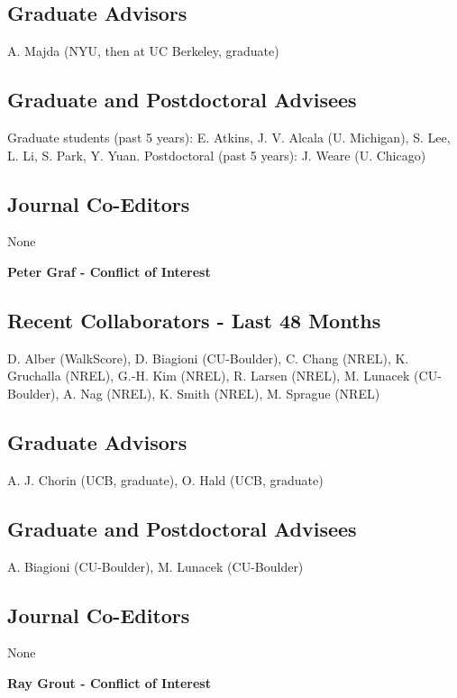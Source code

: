 \documentclass[11pt]{article}
\begin{document}
\subsection*{Graduate Advisors}
A. Majda (NYU, then at UC Berkeley, graduate)

\subsection*{Graduate and Postdoctoral Advisees} 
Graduate students (past 5 years): E. Atkins, J. V. Alcala (U. Michigan), S. Lee, L. Li, S. Park, Y. Yuan.
Postdoctoral (past 5 years): J. Weare (U. Chicago)

\subsection*{Journal Co-Editors} None


\newpage
\begin{center}
{\Large{\textbf{Peter Graf - Conflict of Interest}}}
\end{center}

\subsection*{Recent Collaborators - Last 48 Months}
D. Alber (WalkScore), D. Biagioni (CU-Boulder), C. Chang (NREL), K. Gruchalla (NREL), G.-H. Kim (NREL), R. Larsen (NREL), M. Lunacek (CU-Boulder), A. Nag (NREL), K. Smith (NREL), M. Sprague (NREL)


\subsection*{Graduate Advisors}
A. J. Chorin (UCB, graduate), O. Hald (UCB, graduate)

\subsection*{Graduate and Postdoctoral Advisees} 
A. Biagioni (CU-Boulder), M. Lunacek (CU-Boulder)

\subsection*{Journal Co-Editors} None



\newpage
\begin{center}
{\Large{\textbf{Ray Grout - Conflict of Interest}}}
\end{center}
\end{document}

